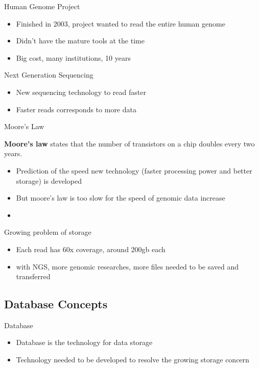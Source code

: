 \documentclass{beamer}
\begin{document}
\begin{frame}{Human Genome Project}
  \begin{itemize}   
    \item Finished in 2003, project wanted to read the entire human genome
    \item Didn't have the mature tools at the time
    \item Big cost, many institutions, 10 years \cite{introgenomics}
  \end{itemize}
\end{frame}

\begin{frame}{Next Generation Sequencing}
  \begin{itemize}   
    \item New sequencing technology to read faster
    \item Faster reads corresponds to more data
  \end{itemize}
\end{frame}

\begin{frame}{Moore's Law}
  \begin{block}{\textbf{Moore's law}} 
    states that the number of transistors on a chip doubles every two years.\cite{kurose}
  \end{block}
  \begin{itemize}   
    \item Prediction of the speed new technology (faster processing power and better storage) is developed
    \item But moore's law is too slow for the speed of genomic data increase
    \item
  \end{itemize}
\end{frame}

\begin{frame}{Growing problem of storage}
  \begin{itemize}   
    \item Each read\cite{seqtorr} has 60x coverage, around 200gb each
    \item with NGS, more genomic researches, more files needed to be saved and transferred
  \end{itemize}
\end{frame}

\subsection{Database Concepts}
\begin{frame}{Database}
  \begin{itemize}   
    \item Database is the technology for data storage
    \item Technology needed to be developed to resolve the growing storage concern
  \end{itemize}
\end{frame}
\end{document}
